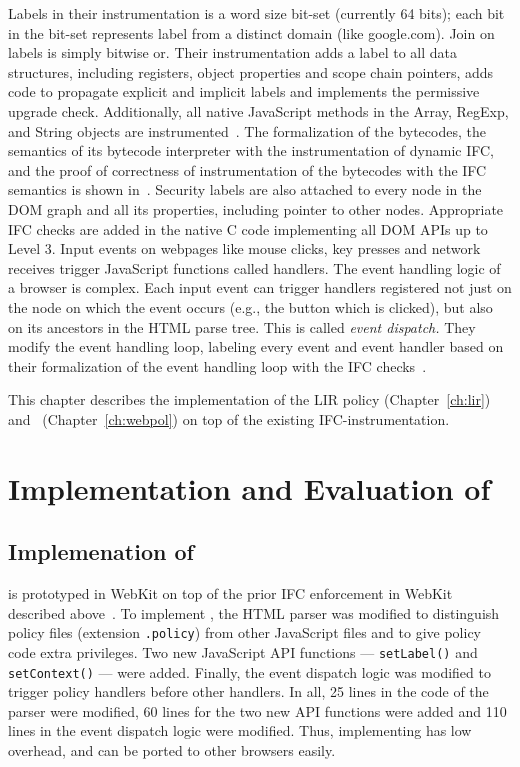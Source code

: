 Labels in their instrumentation is a word size bit-set (currently 64 
bits); each bit in the bit-set represents label from a distinct domain
(like google.com). Join on labels is simply bitwise or. Their
instrumentation adds a label to all data structures, including
registers, object properties and scope chain pointers, adds code to
propagate explicit and implicit labels and implements the permissive
upgrade check. Additionally, all native JavaScript methods in
the Array, RegExp, and String objects are
instrumented~\cite{csf15}. The formalization of the bytecodes, the
semantics of its bytecode interpreter with the instrumentation of
dynamic IFC, and the proof of correctness of instrumentation of the
bytecodes with the IFC semantics is shown in~\cite{post14Extended}. 
Security labels are also attached to every node in the DOM graph and
all its properties, including pointer to other nodes. Appropriate 
IFC checks are added in the native C code implementing all DOM APIs up
to Level 3. 
%
Input events on webpages like mouse clicks, key presses and network
receives trigger JavaScript functions called handlers. The event
handling logic of a browser is complex. Each input event can trigger
handlers registered not just on the node on which the event occurs
(e.g., the button which is clicked), but also on its ancestors in the
HTML parse tree. This is called \emph{event dispatch.} 
They modify the event handling loop, labeling every event and
event handler based on their formalization of the event handling loop
with the IFC checks~\cite{csf15}.  

This chapter describes the implementation of the LIR policy
(Chapter~\ref{ch:lir}) and \sys~(Chapter~\ref{ch:webpol}) on top of
the existing IFC-instrumentation. 

\section{Implementation and Evaluation of \sys}
\label{sec:implpol}
\subsection{Implemenation of \sys}
{\sys} is prototyped in WebKit on top of the prior IFC enforcement in
WebKit described above~\cite{just11PLASTIC,post14,csf15}. To implement
{\sys}, the HTML parser was modified to distinguish policy files
(extension \texttt{.policy}) from other JavaScript files and to give
policy code extra privileges. Two new JavaScript API functions ---
\texttt{setLabel()} and \texttt{setContext()} --- were added. Finally,
the event dispatch logic was modified to trigger policy handlers
before other handlers. In all, 25 lines in the code of the parser were
modified, 60 lines for the two new API functions were added and 110
lines in the event dispatch logic were modified. Thus, implementing
{\sys} has low overhead, and can be ported to other browsers easily.


